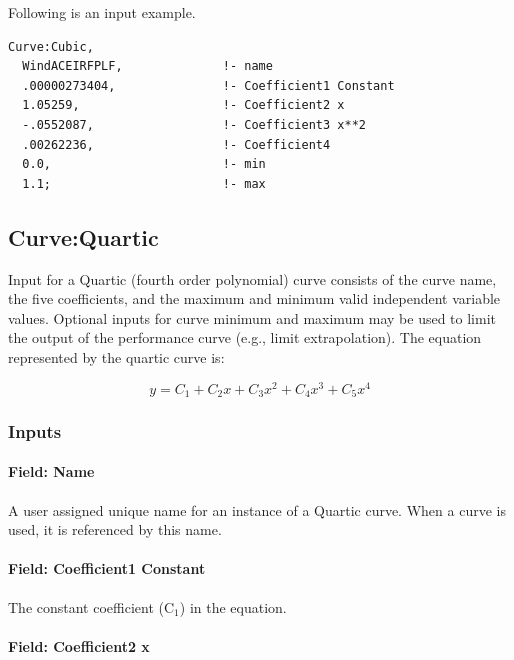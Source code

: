 Following is an input example.

\begin{lstlisting}
Curve:Cubic,
  WindACEIRFPLF,              !- name
  .00000273404,               !- Coefficient1 Constant
  1.05259,                    !- Coefficient2 x
  -.0552087,                  !- Coefficient3 x**2
  .00262236,                  !- Coefficient4
  0.0,                        !- min
  1.1;                        !- max
\end{lstlisting}

\subsection{Curve:Quartic}\label{curvequartic}

Input for a Quartic (fourth order polynomial) curve consists of the curve name, the five coefficients, and the maximum and minimum valid independent variable values. Optional inputs for curve minimum and maximum may be used to limit the output of the performance curve (e.g., limit extrapolation). The equation represented by the quartic curve is:

\begin{equation}
y = {C_1} + {C_2}x + {C_3}{x^2} + {C_4}{x^3} + {C_5}{x^4}
\end{equation}

\subsubsection{Inputs}\label{inputs-4-021}

\paragraph{Field: Name}\label{field-name-4-018}

A user assigned unique name for an instance of a Quartic curve. When a curve is used, it is referenced by this name.

\paragraph{Field: Coefficient1 Constant}\label{field-coefficient1-constant-4}

The constant coefficient (C\(_{1}\)) in the equation.

\paragraph{Field: Coefficient2 x}\label{field-coefficient2-x-3}

